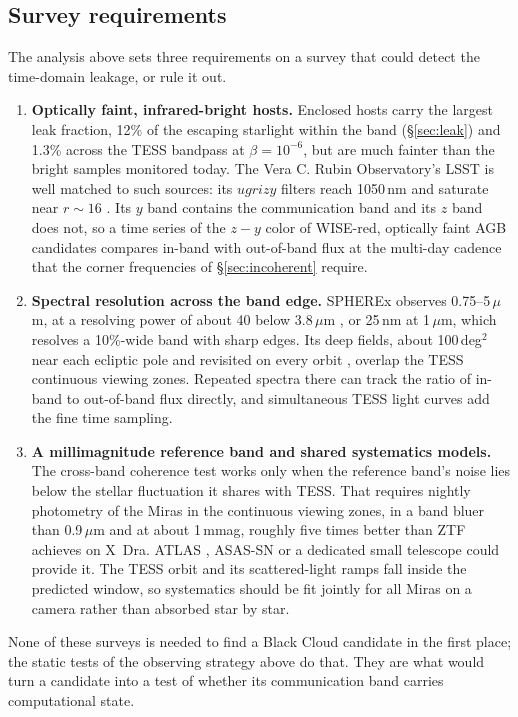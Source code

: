 \documentclass[final,5p]{elsarticle}
\begin{document}
\subsection{Survey requirements}\label{sec:surveys}
The analysis above sets three requirements on a survey that could detect the time-domain leakage, or rule it out.
\begin{enumerate}
\item \textbf{Optically faint, infrared-bright hosts.} Enclosed hosts carry the largest leak fraction, 12\% of the escaping starlight within the band (\S\ref{sec:leak}) and 1.3\% across the TESS bandpass at $\beta=10^{-6}$, but are much fainter than the bright samples monitored today. The Vera C. Rubin Observatory's LSST is well matched to such sources: its $ugrizy$ filters reach 1050\,nm and saturate near $r\sim16$ \citep{Ivezic2019}. Its $y$ band contains the communication band and its $z$ band does not, so a time series of the $z-y$ color of WISE-red, optically faint AGB candidates compares in-band with out-of-band flux at the multi-day cadence that the corner frequencies of \S\ref{sec:incoherent} require.
\item \textbf{Spectral resolution across the band edge.} SPHEREx observes 0.75--5\,$\mu$m, at a resolving power of about 40 below 3.8\,$\mu$m \citep{Dore2014, Crill2020}, or 25\,nm at 1\,$\mu$m, which resolves a 10\%-wide band with sharp edges. Its deep fields, about 100\,deg$^2$ near each ecliptic pole and revisited on every orbit \citep{Crill2020}, overlap the TESS continuous viewing zones. Repeated spectra there can track the ratio of in-band to out-of-band flux directly, and simultaneous TESS light curves add the fine time sampling.
\item \textbf{A millimagnitude reference band and shared systematics models.} The cross-band coherence test works only when the reference band's noise lies below the stellar fluctuation it shares with TESS. That requires nightly photometry of the Miras in the continuous viewing zones, in a band bluer than 0.9\,$\mu$m and at about 1\,mmag, roughly five times better than ZTF achieves on X~Dra. ATLAS \citep{Tonry2018}, ASAS-SN \citep{Shappee2014,Hart2023} or a dedicated small telescope could provide it. The TESS orbit and its scattered-light ramps fall inside the predicted window, so systematics should be fit jointly for all Miras on a camera rather than absorbed star by star.
\end{enumerate}
None of these surveys is needed to find a Black Cloud candidate in the first place; the static tests of the observing strategy above do that. They are what would turn a candidate into a test of whether its communication band carries computational state.
\end{document}
